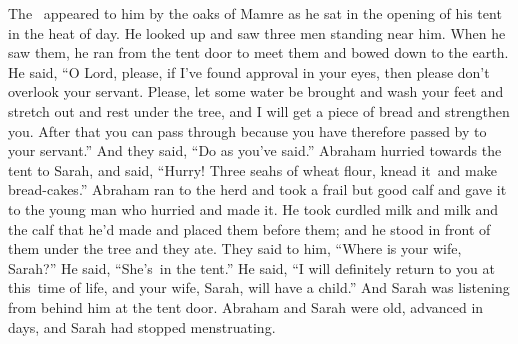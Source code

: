 
\begin{inparaenum}
   The \lord\ appeared to him by the oaks of Mamre as he sat in the opening of his tent in the heat of day.%
   He looked up and saw three men standing near him. When he saw them, he ran from the tent door to meet them and bowed down to the earth.%
   He said, ``O Lord, please, if I've found approval in your eyes, then please don't overlook your servant.%
   Please, let some water be brought and wash your feet and stretch out and rest under the tree,%
   and I will get a piece of bread and strengthen you. After that you can pass through because you have therefore passed by to your servant.'' And they said, ``Do as you've said.''%
   Abraham hurried towards the tent to Sarah, and said, ``Hurry! Three seahs of wheat flour, knead it\understood{}\ and make bread-cakes.''%
   Abraham ran to the herd and took a frail but good calf and gave it to the young man who hurried and made it.%
   He took curdled milk and milk and the calf that he'd made and placed them before them; and he stood in front of them under the tree and they ate.%
   They said to him, ``Where is your wife, Sarah?'' He said, ``She's\understood{}\ in the tent.''%
   He said, ``I will definitely return to you at this\understood{}\ time of life, and your wife, Sarah, will have a child.'' And Sarah was listening from behind him at the tent door.%
   Abraham and Sarah were old, advanced in days, and Sarah had stopped menstruating.%

\end{inparaenum}
